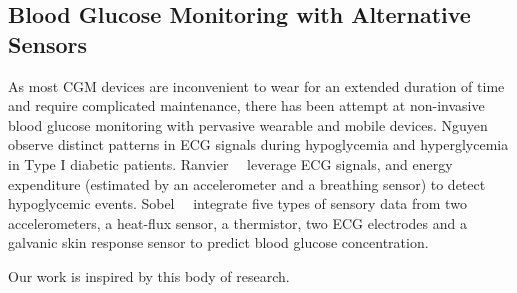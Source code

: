 \subsection{Blood Glucose Monitoring with Alternative Sensors}
As most CGM devices are inconvenient to wear for an extended duration of time and require complicated maintenance, there has been attempt at non-invasive blood glucose monitoring with pervasive wearable and mobile devices.
Nguyen~\etal~\cite{bib:EMBC12:Nguyen} observe distinct patterns in ECG signals during hypoglycemia and hyperglycemia in Type I diabetic patients.
Ranvier~\etal~\cite{bib:SEMPER16:Ranvier} leverage ECG signals, and energy expenditure (estimated by an accelerometer and a breathing sensor) to detect hypoglycemic events.
Sobel~\etal~\cite{bib:JDST14:Sobel} integrate five types of sensory data from two accelerometers, a heat-flux sensor, a thermistor, two ECG electrodes and a galvanic skin response sensor to predict blood glucose concentration.

Our work is inspired by this body of research.

